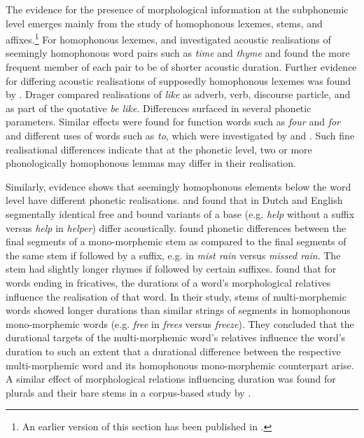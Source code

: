 The evidence for the presence of morphological information at the subphonemic level emerges mainly from the study of homophonous lexemes, stems, and affixes.\protect\footnote{An earlier version of this section has been published in \protect\citet{Schmitz2021a}.} For homophonous lexemes, \citet{Gahl2008} and \citet{Lohmann2018} investigated acoustic realisations of seemingly homophonous word pairs such as \textit{time} and \textit{thyme} and found the more frequent member of each pair to be of shorter acoustic duration. Further evidence for differing acoustic realisations of supposedly homophonous lexemes was found by \citet{Drager2011}. Drager compared realisations of \textit{like} as adverb, verb, discourse particle, and as part of the quotative \textit{be like}. Differences surfaced in several phonetic parameters. Similar effects were found for function words such as \textit{four} and \textit{for} and different uses of words such as \textit{to}, which were investigated by \citet{Lavoie2002} and \citet{Jurafsky2002}. Such fine realisational differences indicate that at the phonetic level, two or more phonologically homophonous lemmas may differ in their realisation.

Similarly, evidence shows that seemingly homophonous elements below the word level have different phonetic realisations. \citet{Kemps2005a} and \citet{Kemps2005b} found that in Dutch and English segmentally identical free and bound variants of a base (e.g. \textit{help} without a suffix versus \textit{help} in \textit{helper}) differ acoustically. \citet{Sugahara2004,Sugahara2009} found phonetic differences between the final segments of a mono-morphemic stem as compared to the final segments of the same stem if followed by a suffix, e.g. in \textit{mist rain} versus \textit{missed rain}. The stem had slightly longer rhymes if followed by certain suffixes. \citet{Seyfarth2017} found that for words ending in fricatives, the durations of a word’s morphological relatives influence the realisation of that word. In their study, stems of multi-morphemic words showed longer durations than similar strings of segments in homophonous mono-morphemic words (e.g. \textit{free} in \textit{frees} versus \textit{freeze}). They concluded that the durational targets of the multi-morphemic word’s relatives influence the word’s duration to such an extent that a durational difference between the respective multi-morphemic word and its homophonous mono-morphemic counterpart arise. A similar effect of morphological relations influencing duration was found for plurals and their bare stems in a corpus-based study by \citet{Engemann2021}.


